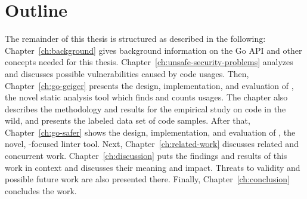 
\section{Outline}\label{sec:introduction:outline}

The remainder of this thesis is structured as described in the following: Chapter~\ref{ch:background} gives background
information on the Go \unsafe{} \acrshort{API} and other concepts needed for this thesis.
Chapter~\ref{ch:unsafe-security-problems} analyzes and discusses possible vulnerabilities caused by \unsafe{} code
usages.
Then, Chapter~\ref{ch:go-geiger} presents the design, implementation, and evaluation of \toolGeiger, the novel static
analysis tool which finds and counts \unsafe{} usages.
The chapter also describes the methodology and results for the empirical study on \unsafe{} code in the wild, and
presents the labeled data set of \unsafe{} code samples.
After that, Chapter~\ref{ch:go-safer} shows the design, implementation, and evaluation of \toolSafer, the novel,
\unsafe{}-focused linter tool.
Next, Chapter~\ref{ch:related-work} discusses related and concurrent work.
Chapter~\ref{ch:discussion} puts the findings and results of this work in context and discusses their meaning and
impact.
Threats to validity and possible future work are also presented there.
Finally, Chapter~\ref{ch:conclusion} concludes the work.
